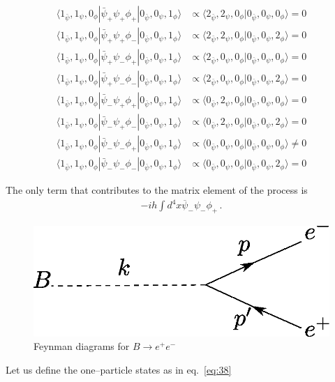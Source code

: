 \begin{align*}
 \langle1_{\bar{\psi}},1_{\psi},0_{\phi}|\bar{\psi}_{+}\psi_{+}\phi_{+}|0_{\bar{\psi}},0_{\psi},1_{\phi}\rangle  &\propto  \langle2_{\bar{\psi}},2_{\psi},0_{\phi}|0_{\bar{\psi}},0_{\psi},0_{\phi}\rangle =0\\ 
 \langle1_{\bar{\psi}},1_{\psi},0_{\phi}|\bar{\psi}_{+}\psi_{+}\phi_{-}|0_{\bar{\psi}},0_{\psi},1_{\phi}\rangle  &\propto  \langle2_{\bar{\psi}},2_{\psi},0_{\phi}|0_{\bar{\psi}},0_{\psi},2_{\phi}\rangle =0\\ 
 \langle1_{\bar{\psi}},1_{\psi},0_{\phi}|\bar{\psi}_{+}\psi_{-}\phi_{+}|0_{\bar{\psi}},0_{\psi},1_{\phi}\rangle  &\propto  \langle2_{\bar{\psi}},0_{\psi},0_{\phi}|0_{\bar{\psi}},0_{\psi},0_{\phi}\rangle =0\\ 
 \langle1_{\bar{\psi}},1_{\psi},0_{\phi}|\bar{\psi}_{+}\psi_{-}\phi_{-}|0_{\bar{\psi}},0_{\psi},1_{\phi}\rangle  &\propto  \langle2_{\bar{\psi}},0_{\psi},0_{\phi}|0_{\bar{\psi}},0_{\psi},2_{\phi}\rangle =0\\ 
 \langle1_{\bar{\psi}},1_{\psi},0_{\phi}|\bar{\psi}_{-}\psi_{+}\phi_{+}|0_{\bar{\psi}},0_{\psi},1_{\phi}\rangle  &\propto  \langle0_{\bar{\psi}},2_{\psi},0_{\phi}|0_{\bar{\psi}},0_{\psi},0_{\phi}\rangle =0\\ 
 \langle1_{\bar{\psi}},1_{\psi},0_{\phi}|\bar{\psi}_{-}\psi_{+}\phi_{-}|0_{\bar{\psi}},0_{\psi},1_{\phi}\rangle  &\propto  \langle0_{\bar{\psi}},2_{\psi},0_{\phi}|0_{\bar{\psi}},0_{\psi},2_{\phi}\rangle =0\\ 
 \langle1_{\bar{\psi}},1_{\psi},0_{\phi}|\bar{\psi}_{-}\psi_{-}\phi_{+}|0_{\bar{\psi}},0_{\psi},1_{\phi}\rangle  &\propto  \langle0_{\bar{\psi}},0_{\psi},0_{\phi}|0_{\bar{\psi}},0_{\psi},0_{\phi}\rangle \neq 0\\
 \langle1_{\bar{\psi}},1_{\psi},0_{\phi}|\bar{\psi}_{-}\psi_{-}\phi_{-}|0_{\bar{\psi}},0_{\psi},1_{\phi}\rangle  &\propto  \langle0_{\bar{\psi}},0_{\psi},0_{\phi}|0_{\bar{\psi}},0_{\psi},2_{\phi}\rangle =0
\end{align*}


The only term that contributes to the matrix element of the process is
\begin{align}
  \label{eq:97}
  -i h \int d^4x\overline{\psi}_-\psi_-\phi_+\,.
\end{align}

\begin{figure} %
  \centering %
  \includegraphics[scale=0.6]{Btoee} %
  \caption{Feynman diagrams for $B\to e^+ e^-$} %
  \label{fig:btoee} %
\end{figure} %
Let us define the one--particle states as in eq.~\eqref{eq:38}

